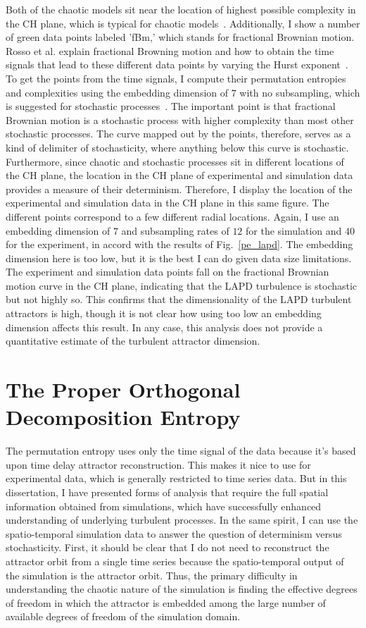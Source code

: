 Both of the chaotic models sit near the location of highest possible complexity in the CH plane, which is typical for chaotic models~\cite{rosso2007}.
Additionally, I show a number of green data points labeled 'fBm,' which stands for fractional Brownian motion. Rosso et al. explain fractional Browning motion and how to obtain the time signals
that lead to these different data points by varying the Hurst exponent~\cite{rosso2007}. 
To get the points from the time signals, I compute their permutation entropies and complexities using the embedding dimension of $7$ with no subsampling,
which is suggested for stochastic processes~\cite{riedle2013}. The important point is that fractional Brownian motion is a stochastic process with higher complexity than most other stochastic
processes. The curve mapped out by the points, therefore, serves as a kind of delimiter of stochasticity, where anything below this curve is stochastic. Furthermore, since 
chaotic and stochastic processes sit in different locations of the CH plane, the location in the CH plane of experimental and simulation data provides a measure of their determinism.
Therefore, I display the location of the experimental and simulation data in the CH plane in this same figure. The different points correspond to a few different radial locations. 
Again, I use an embedding dimension of $7$ and subsampling rates of $12$ for the simulation and $40$ for the experiment,
in accord with the results of Fig.~\ref{pe_lapd}. The embedding dimension here is too low, but it is the best I can do given data size limitations. The experiment and simulation
data points fall on the fractional Brownian motion curve in the CH plane, indicating that the LAPD turbulence is stochastic but not highly so. This confirms that the dimensionality
of the LAPD turbulent attractors is high, though it is not clear how using too low an embedding dimension affects this result. In any case, this analysis does not provide a quantitative estimate
of the turbulent attractor dimension.

\section{The Proper Orthogonal Decomposition Entropy}
\label{s_pod_chaos}

The permutation entropy uses only the time signal of the data because it's based upon time delay attractor reconstruction. This makes it nice to use for experimental data, which is generally
restricted to time series data. But in this dissertation, I have presented forms of analysis that require the full spatial information obtained from simulations, which have successfully
enhanced understanding of underlying turbulent processes. In the same spirit, I can use the spatio-temporal simulation data to answer the question of determinism versus stochasticity.
First, it should be clear that I do not need to reconstruct the attractor orbit from a single time series because the spatio-temporal output of the simulation is the attractor orbit. 
Thus, the primary difficulty in understanding the chaotic nature of the simulation is finding the effective degrees of freedom in which the attractor is embedded among the large number of 
available degrees of freedom of the simulation domain. 

